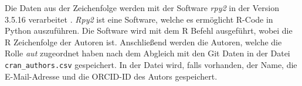 Die Daten aus der Zeichenfolge werden mit der Software \emph{rpy2} in der Version 3.5.16 verarbeitet \autocite{noauthor_rpy2rpy2_2024}.
\emph{Rpy2} ist eine Software, welche es ermöglicht R-Code in Python auszuführen.
Die Software wird mit dem R Befehl  ausgeführt, wobei  die R Zeichenfolge der Autoren ist.
Anschließend werden die Autoren, welche die Rolle \emph{aut} zugeordnet haben nach dem Abgleich mit den Git Daten in der Datei \texttt{cran\_authors.csv} gespeichert.
In der Datei wird, falls vorhanden, der Name, die E-Mail-Adresse und die ORCID-ID des Autors gespeichert.

